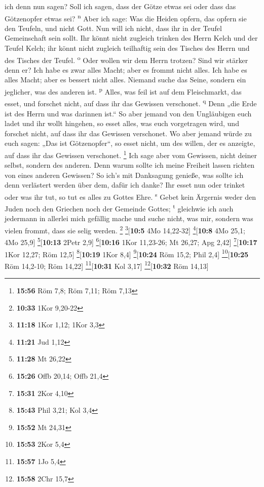 ich denn nun sagen? Soll ich sagen, dass der Götze etwas sei oder dass
das Götzenopfer etwas sei? \textsuperscript{n}  Aber ich
sage: Was die Heiden opfern, das opfern sie den Teufeln, und nicht Gott.
Nun will ich nicht, dass ihr in der Teufel Gemeinschaft sein sollt.
 Ihr könnt nicht zugleich trinken des Herrn Kelch und der
Teufel Kelch; ihr könnt nicht zugleich teilhaftig sein des Tisches des
Herrn und des Tisches der Teufel. \textsuperscript{o} 
Oder wollen wir dem Herrn trotzen? Sind wir stärker denn er?
 Ich habe es zwar alles Macht; aber es frommt nicht
alles. Ich habe es alles Macht; aber es bessert nicht alles.
 Niemand suche das Seine, sondern ein jeglicher, was des
anderen ist. \textsuperscript{p}  Alles, was feil ist auf
dem Fleischmarkt, das esset, und forschet nicht, auf dass ihr das
Gewissen verschonet. \textsuperscript{q}  Denn „die Erde
ist des Herrn und was darinnen ist.``  So aber jemand von
den Ungläubigen euch ladet und ihr wollt hingehen, so esset alles, was
euch vorgetragen wird, und forschet nicht, auf dass ihr das Gewissen
verschonet.  Wo aber jemand würde zu euch sagen: „Das ist
Götzenopfer``, so esset nicht, um des willen, der es anzeigte, auf dass
ihr das Gewissen verschonet. \footnote{\textbf{15:56} Röm 7,8; Röm 7,11;
  Röm 7,13}  Ich sage aber vom Gewissen, nicht deiner
selbst, sondern des anderen. Denn warum sollte ich meine Freiheit lassen
richten von eines anderen Gewissen?  So ich's mit
Danksagung genieße, was sollte ich denn verlästert werden über dem,
dafür ich danke?  Ihr esset nun oder trinket oder was ihr
tut, so tut es alles zu Gottes Ehre. \textsuperscript{s} 
Gebet kein Ärgernis weder den Juden noch den Griechen noch der Gemeinde
Gottes; \textsuperscript{t}  gleichwie ich auch jedermann
in allerlei mich gefällig mache und suche nicht, was mir, sondern was
vielen frommt, dass sie selig werden. \footnote{\textbf{10:33} 1Kor
  9,20-22} \footnote{\textbf{11:18} 1Kor 1,12; 1Kor 3,3}{[}\textbf{10:5}
4Mo 14,22-32{]} \footnote{\textbf{11:21} Jud 1,12}{[}\textbf{10:8} 4Mo
25,1; 4Mo 25,9{]} \footnote{\textbf{11:28} Mt 26,22}{[}\textbf{10:13}
2Petr 2,9{]} \footnote{\textbf{15:26} Offb 20,14; Offb 21,4}{[}\textbf{10:16}
1Kor 11,23-26; Mt 26,27; Apg 2,42{]} \footnote{\textbf{15:31} 2Kor 4,10}{[}\textbf{10:17}
1Kor 12,27; Röm 12,5{]} \footnote{\textbf{15:43} Phil 3,21; Kol 3,4}{[}\textbf{10:19}
1Kor 8,4{]} \footnote{\textbf{15:52} Mt 24,31}{[}\textbf{10:24} Röm
15,2; Phil 2,4{]} \footnote{\textbf{15:53} 2Kor 5,4}{[}\textbf{10:25}
Röm 14,2-10; Röm 14,22{]} \footnote{\textbf{15:57} 1Jo 5,4}{[}\textbf{10:31}
Kol 3,17{]} \footnote{\textbf{15:58} 2Chr 15,7}{[}\textbf{10:32} Röm
14,13{]}

